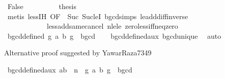 \begin{isabellebody}
\ False\isanewline
\ \ \ \ \ \ \isamarkupfalse%
\ \isamarkupfalse%
\ {\isacharquery}{\kern0pt}thesis\isanewline
\ \ \ \ \ \ \ \ \isamarkupfalse%
\ {\isacharparenleft}{\kern0pt}metis\ less{\isachardot}{\kern0pt}IH\ {\isacharbrackleft}{\kern0pt}OF\ {\isacharasterisk}{\kern0pt}{\isacharbrackright}{\kern0pt}\ Suc\ Suc{\isacharunderscore}{\kern0pt}leI\ bgcd{\isachardot}{\kern0pt}simps\ le{\isacharunderscore}{\kern0pt}add{\isacharunderscore}{\kern0pt}diff{\isacharunderscore}{\kern0pt}inverse\ \isanewline
\ \ \ \ \ \ \ \ \ \ \ \ less{\isacharunderscore}{\kern0pt}add{\isacharunderscore}{\kern0pt}same{\isacharunderscore}{\kern0pt}cancel{}\ nle{\isacharunderscore}{\kern0pt}le\ zero{\isacharunderscore}{\kern0pt}less{\isacharunderscore}{\kern0pt}iff{\isacharunderscore}{\kern0pt}neq{\isacharunderscore}{\kern0pt}zero{\isacharparenright}{\kern0pt}\isanewline
\ \ \ \ \isamarkupfalse%
\isanewline
\ \ \isamarkupfalse%
\isanewline
{}\isamarkupfalse%
%
\endisatagproof
{\isafoldproof}%
%
\isadelimproof
\isanewline
%
\endisadelimproof
\isanewline
{}\isamarkupfalse%
\ bgcd{\isacharunderscore}{\kern0pt}defined{\isacharcolon}{\kern0pt}\ {\isachardoublequoteopen}{\isasymexists}{\isacharbang}{\kern0pt}g{\isachardot}{\kern0pt}\ {\isacharparenleft}{\kern0pt}a{\isacharcomma}{\kern0pt}\ b{\isacharcomma}{\kern0pt}\ g{\isacharparenright}{\kern0pt}\ {\isasymin}\ bgcd{\isachardoublequoteclose}\isanewline
%
\isadelimproof
\ \ %
\endisadelimproof
%
\isatagproof
{}\isamarkupfalse%
\ bgcd{\isacharunderscore}{\kern0pt}defined{\isacharunderscore}{\kern0pt}aux\ bgcd{\isacharunderscore}{\kern0pt}unique\ \isamarkupfalse%
\ auto%
\endisatagproof
{\isafoldproof}%
%
\isadelimproof
%
\endisadelimproof
%
\begin{isamarkuptext}%
Alternative proof suggested by YawarRaza7349%
\end{isamarkuptext}\isamarkuptrue%
\isamarkupfalse%
\ bgcd{\isacharunderscore}{\kern0pt}defined{\isacharunderscore}{\kern0pt}aux{\isacharprime}{\kern0pt}{\isacharcolon}{\kern0pt}\ {\isachardoublequoteopen}a{\isacharplus}{\kern0pt}b\ {\isacharequal}{\kern0pt}\ n\ {\isasymLongrightarrow}\ {\isasymexists}g{\isachardot}{\kern0pt}\ {\isacharparenleft}{\kern0pt}a{\isacharcomma}{\kern0pt}\ b{\isacharcomma}{\kern0pt}\ g{\isacharparenright}{\kern0pt}\ {\isasymin}\ bgcd{\isachardoublequoteclose}\isanewline
%
\isadelimproof
%
\endisadelimproof
%
\isatagproof
{}\isamarkupfalse%

\end{isabellebody}

